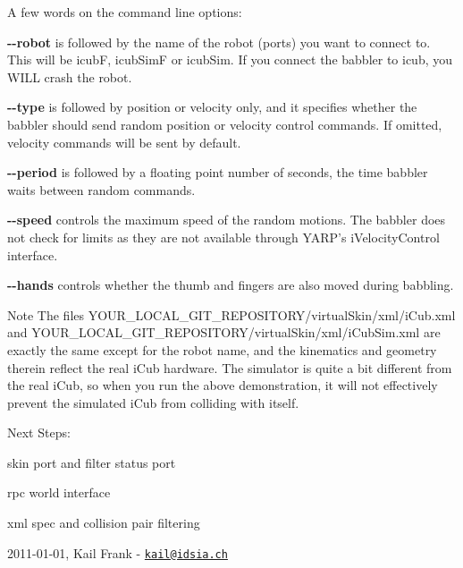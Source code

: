 A few words on the command line options:
\begin{DoxyItemize}
\item {\bfseries -\/-\/robot} is followed by the name of the robot (ports) you want to connect to. This will be {\ttfamily icubF}, {\ttfamily icubSimF} or {\ttfamily icubSim}. If you connect the babbler to {\ttfamily icub}, you WILL crash the robot.
\item {\bfseries -\/-\/type} is followed by {\ttfamily position} or {\ttfamily velocity} only, and it specifies whether the babbler should send random position or velocity control commands. If omitted, velocity commands will be sent by default.
\item {\bfseries -\/-\/period} is followed by a floating point number of seconds, the time babbler waits between random commands.
\item {\bfseries -\/-\/speed} controls the maximum speed of the random motions. The babbler does not check for limits as they are not available through YARP's iVelocityControl interface.
\item {\bfseries -\/-\/hands} controls whether the thumb and fingers are also moved during babbling.
\end{DoxyItemize}

\begin{DoxyNote}{Note}
The files {\ttfamily YOUR\_\-LOCAL\_\-GIT\_\-REPOSITORY/virtualSkin/xml/iCub.xml} and {\ttfamily YOUR\_\-LOCAL\_\-GIT\_\-REPOSITORY/virtualSkin/xml/iCubSim.xml} are exactly the same except for the robot name, and the kinematics and geometry therein reflect the real iCub hardware. The simulator is quite a bit different from the real iCub, so when you run the above demonstration, it will not effectively prevent the simulated iCub from colliding with itself.
\end{DoxyNote}
Next Steps:
\begin{DoxyItemize}
\item skin port and filter status port
\item rpc world interface
\item xml spec and collision pair filtering
\end{DoxyItemize}

2011-\/01-\/01, Kail Frank -\/ \href{mailto:kail@idsia.ch}{\tt kail@idsia.ch} 